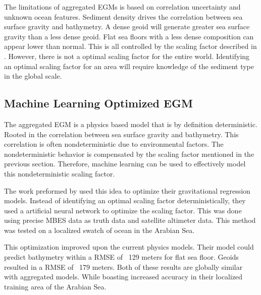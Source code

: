 \par
The limitations of aggregated \ac{EGM}s is based on correlation uncertainty and unknown ocean features.
Sediment density drives the correlation between sea surface gravity and bathymetry.
A dense geoid will generate greater sea surface gravity than a less dense geoid.
Flat sea floors with a less dense composition can appear lower than normal.
This is all controlled by the scaling factor described in \cite{smith1994bathymetric}. 
However, there is not a optimal scaling factor for the entire world.
Identifying an optimal scaling factor for an area will require knowledge of the sediment type in the global scale.


\subsection{Machine Learning Optimized \ac{EGM}}
The aggregated \ac{EGM} is a physics based model that is by definition deterministic.
Rooted in the correlation between sea surface gravity and bathymetry.
This correlation is often nondeterministic due to environmental factors.
The nondeterministic behavior is compensated by the scaling factor mentioned in the previous section.
Therefore, machine learning can be used to effectively model this nondeterministic scaling factor.

\par
The work preformed by \cite{jena2012prediction} used this idea to optimize their gravitational regression models.
Instead of identifying an optimal scaling factor deterministically, they used a artificial neural network to optimize the scaling factor.
This was done using precise \ac{MBES} data as truth data and satellite altimeter data.
This method was tested on a localized swatch of ocean in the Arabian Sea.

\par
This optimization improved upon the current physics models.
Their model could predict bathymetry within a \ac{RMSE} of ~129 meters for flat sea floor.
Geoids resulted in a \ac{RMSE} of ~179 meters.
Both of these results are globally similar with aggregated models.
While boasting increased accuracy in their localized training area of the Arabian Sea.


